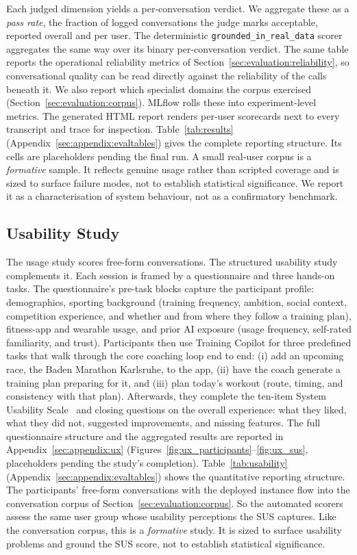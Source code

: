 Each judged dimension yields a per-conversation verdict. We aggregate these as a \textit{pass rate}, the fraction of logged conversations the judge marks acceptable, reported overall and per user. The deterministic \texttt{grounded\_in\_real\_data} scorer aggregates the same way over its binary per-conversation verdict. The same table reports the operational reliability metrics of Section~\ref{sec:evaluation:reliability}, so conversational quality can be read directly against the reliability of the calls beneath it. We also report which specialist domains the corpus exercised (Section~\ref{sec:evaluation:corpus}). MLflow rolls these into experiment-level metrics. The generated HTML report renders per-user scorecards next to every transcript and trace for inspection. Table~\ref{tab:results} (Appendix~\ref{sec:appendix:evaltables}) gives the complete reporting structure. Its cells are placeholders pending the final run. A small real-user corpus is a \textit{formative} sample. It reflects genuine usage rather than scripted coverage and is sized to surface failure modes, not to establish statistical significance. We report it as a characterisation of system behaviour, not as a confirmatory benchmark.

\subsection{Usability Study}\label{sec:evaluation:usability}

The usage study scores free-form conversations. The structured usability study complements it. Each session is framed by a questionnaire and three hands-on tasks. The questionnaire's pre-task blocks capture the participant profile: demographics, sporting background (training frequency, ambition, social context, competition experience, and whether and from where they follow a training plan), fitness-app and wearable usage, and prior AI exposure (usage frequency, self-rated familiarity, and trust). Participants then use Training Copilot for three predefined tasks that walk through the core coaching loop end to end: (i) add an upcoming race, the Baden Marathon Karlsruhe, to the app, (ii) have the coach generate a training plan preparing for it, and (iii) plan today's workout (route, timing, and consistency with that plan). Afterwards, they complete the ten-item System Usability Scale~\citep{brooke_sus_1996} and closing questions on the overall experience: what they liked, what they did not, suggested improvements, and missing features. The full questionnaire structure and the aggregated results are reported in Appendix~\ref{sec:appendix:ux} (Figures~\ref{fig:ux_participants}--\ref{fig:ux_sus}, placeholders pending the study's completion). Table~\ref{tab:usability} (Appendix~\ref{sec:appendix:evaltables}) shows the quantitative reporting structure. The participants' free-form conversations with the deployed instance flow into the conversation corpus of Section~\ref{sec:evaluation:corpus}. So the automated scorers assess the same user group whose usability perceptions the SUS captures. Like the conversation corpus, this is a \textit{formative} study. It is sized to surface usability problems and ground the SUS score, not to establish statistical significance.

